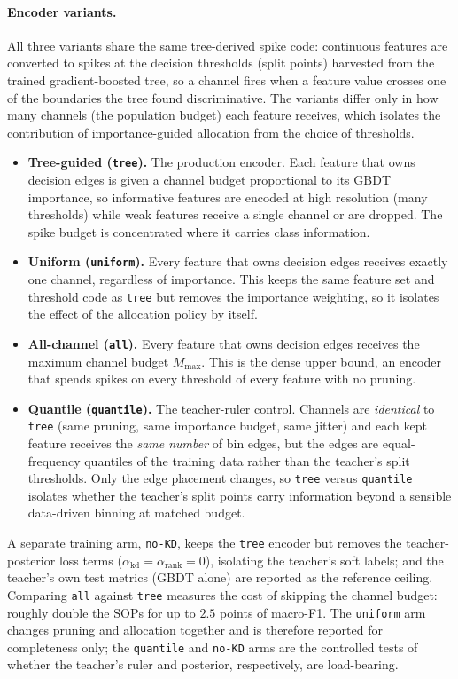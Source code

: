 \paragraph{Encoder variants.}
All three variants share the same tree-derived spike code: continuous features are
converted to spikes at the decision thresholds (split points) harvested from the
trained gradient-boosted tree, so a channel fires when a feature value crosses one of
the boundaries the tree found discriminative. The variants differ only in how many
channels (the population budget) each feature receives, which isolates the contribution
of importance-guided allocation from the choice of thresholds.
\begin{itemize}
  \item \textbf{Tree-guided (\texttt{tree}).} The production encoder. Each feature that
  owns decision edges is given a channel budget proportional to its GBDT importance, so
  informative features are encoded at high resolution (many thresholds) while weak
  features receive a single channel or are dropped. The spike budget is concentrated
  where it carries class information.
  \item \textbf{Uniform (\texttt{uniform}).} Every feature that owns decision edges
  receives exactly one channel, regardless of importance. This keeps the same feature
  set and threshold code as \texttt{tree} but removes the importance weighting, so it
  isolates the effect of the allocation policy by itself.
  \item \textbf{All-channel (\texttt{all}).} Every feature that owns decision edges
  receives the maximum channel budget $M_{\max}$. This is the dense upper bound, an
  encoder that spends spikes on every threshold of every feature with no pruning.
  \item \textbf{Quantile (\texttt{quantile}).} The teacher-ruler control. Channels are
  \emph{identical} to \texttt{tree} (same pruning, same importance budget, same jitter)
  and each kept feature receives the \emph{same number} of bin edges, but the edges are
  equal-frequency quantiles of the training data rather than the teacher's split
  thresholds. Only the edge placement changes, so \texttt{tree} versus \texttt{quantile}
  isolates whether the teacher's split points carry information beyond a sensible
  data-driven binning at matched budget.
\end{itemize}
A separate training arm, \texttt{no-KD}, keeps the \texttt{tree} encoder but removes
the teacher-posterior loss terms ($\alpha_{\mathrm{kd}} = \alpha_{\mathrm{rank}} = 0$),
isolating the teacher's soft labels; and the teacher's own test metrics (GBDT alone)
are reported as the reference ceiling. Comparing \texttt{all} against \texttt{tree}
measures the cost of skipping the channel budget: roughly double the SOPs for up to
$2.5$ points of macro-F1. The \texttt{uniform} arm changes pruning and allocation
together and is therefore reported for completeness only; the \texttt{quantile} and
\texttt{no-KD} arms are the controlled tests of whether the teacher's ruler and
posterior, respectively, are load-bearing.
